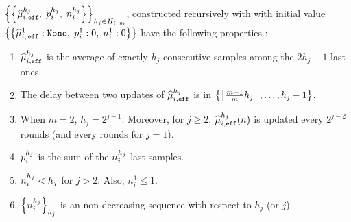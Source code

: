 \begin{proposition}
\label{prop:effu}
 $\left\{\left\{  \widehat{\mu}_{i,\texttt{eff}}^{h_j},\; p_i^{h_j}, \; n_i^{h_j} \right\}\right\}_{h_j \in H_{i,\,m}}$, constructed recursively with \EFF with initial value $\left\{\left\{  \widehat{\mu}_{i,\,\texttt{eff}}^1 : \texttt{None},\; p_i^{1} :0 , \; n_i^{1}:0 \right\}\right\}$ have the following properties :
 \begin{enumerate}[topsep=0pt]
  \item $\widehat{\mu}_{i,\texttt{eff}}^{h_j}$ is the average of exactly $h_j$ consecutive samples among the $2h_j -1$ last ones. \label{list:effu-hmu}
  \item The delay between two updates of $\widehat{\mu}_{i,\texttt{eff}}^{h_j}$ is in $\left\{\left\lceil\frac{m-1}{m} h_j\right\rceil, \dots, h_j -1\right\}$.\label{list:effu-delay}
  \item When $m = 2$, $h_j = 2^{j-1}$. Moreover, for $j\geq2$, $\widehat{\mu}_{i,\texttt{eff}}^{h_j}(n)$ is updated every $2^{j-2}$ rounds (and every rounds for $j=1$).\label{list:effu-m2}
  \item $p_i^{h_j}$ is the sum of the $n_i^{h_j}$ last samples. \label{list:effu-p}
  \item $n_i^{h_j} < h_j$ for $j>2$. Also, $n_i^1 \leq 1$.\label{list:effu-n1}
  \item $\left\{ n_i^{h_j} \right\}_{h_j}$ is an non-decreasing sequence with respect to $h_j$ (or $j$).\label{list:effu-n2}
 \end{enumerate}
\end{proposition}
